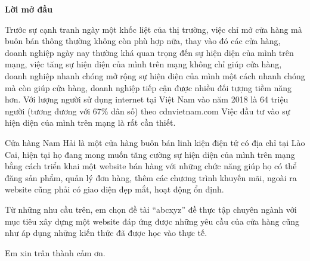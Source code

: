     \begin{center}
        \textbf{Lời mở đầu}
    \end{center}
    Trước sự cạnh tranh ngày một khốc liệt của thị trường, việc chỉ mở cửa hàng mà buôn bán thông thường không còn phù hợp nữa, thay vào đó các cửa hàng, doanh nghiệp ngày nay thường khá quan trọng đến sự hiện diện của mình trên mạng, việc tăng sự hiện diện của mình trên mạng không chỉ giúp cửa hàng, doanh nghiệp nhanh chóng mở rộng sự hiện diện của mình một cách nhanh chóng mà còn giúp cửa hàng, doanh nghiệp tiếp cận được nhiều đối tượng tiềm năng hơn. Với lượng người sử dụng internet tại Việt Nam vào năm 2018 là 64 triệu người (tương đương với 67\% dân số) theo cdnvietnam.com Việc đầu tư vào sự hiện diện của mình trên mạng là rất cần thiết.
    
    Cửa hàng Nam Hải là một cửa hàng buôn bán linh kiện điện tử có địa chỉ tại Lào Cai, hiện tại họ đang mong muốn tăng cường sự hiện diện của mình trên mạng bằng cách triển khai một website bán hàng với những chức năng giúp họ có thể đăng sản phẩm, quản lý đơn hàng, thêm các chương trình khuyến mãi, ngoài ra website cũng phải có giao diện đẹp mắt, hoạt động ổn định.
    
    Từ những nhu cầu trên, em chọn đề tài “abcxyz” đề thực tập chuyên ngành với mục tiêu xây dựng một website đáp ứng được những yêu cầu của cửa hàng cũng như áp dụng những kiến thức đã được học vào thực tế.
    
    Em xin trân thành cảm ơn.
